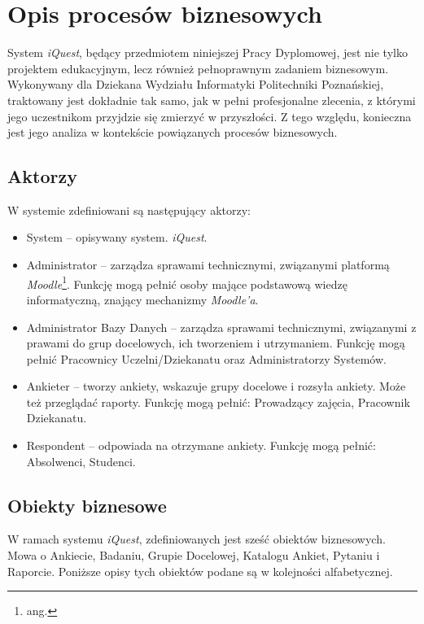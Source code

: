 \chapter{Opis procesów biznesowych}
\label{Chapter2}

System \textit{iQuest}, będący przedmiotem niniejszej Pracy Dyplomowej, jest nie tylko projektem edukacyjnym, lecz również pełnoprawnym zadaniem biznesowym. Wykonywany dla Dziekana Wydziału Informatyki Politechniki Poznańskiej, traktowany jest dokładnie tak samo, jak w pełni profesjonalne zlecenia, z którymi jego uczestnikom przyjdzie się zmierzyć w przyszłości. Z tego względu, konieczna jest jego analiza w kontekście powiązanych procesów biznesowych.

\section{Aktorzy}
\label{Chapter21}

W systemie zdefiniowani są następujący aktorzy:
\begin{itemize}
\item System -- opisywany system. \textit{iQuest}.
\item Administrator -- zarządza sprawami technicznymi, związanymi platformą \textit{Moodle}\footnote{ang. }. Funkcję mogą pełnić osoby mające podstawową wiedzę informatyczną, znający mechanizmy \textit{Moodle'a}.
\item Administrator Bazy Danych -- zarządza sprawami technicznymi, związanymi z prawami do grup docelowych, ich tworzeniem i utrzymaniem. Funkcję mogą pełnić Pracownicy Uczelni\slash Dziekanatu oraz Administratorzy Systemów.
\item Ankieter -- tworzy ankiety, wskazuje grupy docelowe i rozsyła ankiety. Może też przeglądać raporty. Funkcję mogą pełnić: Prowadzący zajęcia, Pracownik Dziekanatu.
\item Respondent -- odpowiada na otrzymane ankiety. Funkcję mogą pełnić: Absolwenci, Studenci.
\end{itemize}

\section{Obiekty biznesowe}
\label{Chapter22}

W ramach systemu \textit{iQuest}, zdefiniowanych jest sześć obiektów biznesowych. Mowa o Ankiecie, Badaniu, Grupie Docelowej, Katalogu Ankiet, Pytaniu i Raporcie. Poniższe opisy tych obiektów podane są w kolejności alfabetycznej.

